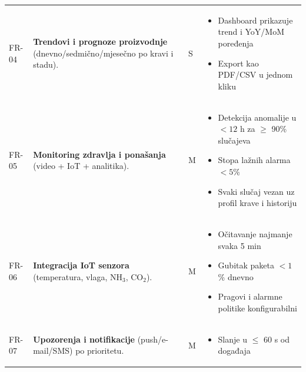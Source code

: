 \documentclass{article}
\begin{document}
\begin{longtable}{|L{1.6cm}|L{8.0cm}|C{0.9cm}|L{6.2cm}|}
\begin{minipage}[t]{6.2cm}
\end{minipage} \\
\hline
FR-04 & \textbf{Trendovi i prognoze proizvodnje} (dnevno/sedmično/mjesečno po kravi i stadu). & S &
\begin{minipage}[t]{6.2cm}\vspace{2pt}
\begin{itemize}\setlength\itemsep{2pt}
    \item Dashboard prikazuje trend i YoY/MoM poređenja
    \item Export kao PDF/CSV u jednom kliku
\end{itemize}\vspace{2pt}
\end{minipage} \\
\hline
FR-05 & \textbf{Monitoring zdravlja i ponašanja} (video + IoT + analitika). & M &
\begin{minipage}[t]{6.2cm}\vspace{2pt}
\begin{itemize}\setlength\itemsep{2pt}
    \item Detekcija anomalije u $<12$ h za $\geq$ 90\% slučajeva
    \item Stopa lažnih alarma $<5$\%
    \item Svaki slučaj vezan uz profil krave i historiju
\end{itemize}\vspace{2pt}
\end{minipage} \\
\hline
FR-06 & \textbf{Integracija IoT senzora} (temperatura, vlaga, NH$_3$, CO$_2$). & M &
\begin{minipage}[t]{6.2cm}\vspace{2pt}
\begin{itemize}\setlength\itemsep{2pt}
    \item Očitavanje najmanje svaka 5 min
    \item Gubitak paketa $<1$\% dnevno
    \item Pragovi i alarmne politike konfigurabilni
\end{itemize}\vspace{2pt}
\end{minipage} \\
\hline
FR-07 & \textbf{Upozorenja i notifikacije} (push/e-mail/SMS) po prioritetu. & M &
\begin{minipage}[t]{6.2cm}\vspace{2pt}
\begin{itemize}\setlength\itemsep{2pt}
    \item Slanje u $\leq$ 60 s od događaja

\end{itemize}
\end{minipage}
\end{longtable}
\end{document}
